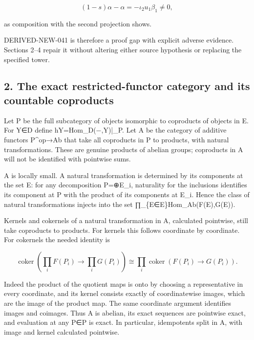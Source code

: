 \documentclass[11pt]{article}
\begin{document}
\[
 (1-s)\alpha-\alpha=-\iota_2u_1\beta_1\ne0,
\]

as composition with the second projection shows.

DERIVED-NEW-041 is therefore a proof gap with explicit adverse evidence. Sections 2–\allowbreak{}4 repair it without altering either source hypothesis or replacing the specified tower.

\subsection{2. The exact restricted-functor category and its countable coproducts}\label{proofs-11460-11655-the-exact-restricted-functor-category-and-its-countable-coproducts}

Let P be the full subcategory of objects isomorphic to coproducts of objects in E. For Y\allowbreak{}∈D define hY\allowbreak{}=Hom\_\allowbreak{}D(−,\allowbreak{}Y)\allowbreak{}|\_\allowbreak{}P. Let A be the category of additive functors P\textasciicircum{}op\allowbreak{}→Ab that take all coproducts in P to products,\allowbreak{} with natural transformations. These are genuine products of abelian groups; coproducts in A will not be identified with pointwise sums.

A is locally small. A natural transformation is determined by its components at the set E:\allowbreak{} for any decomposition P\allowbreak{}=\allowbreak{}⊕E\_\allowbreak{}i,\allowbreak{} naturality for the inclusions identifies its component at P with the product of its components at E\_\allowbreak{}i. Hence the class of natural transformations injects into the set ∏\_\allowbreak{}\{E\allowbreak{}∈E\}Hom\_\allowbreak{}Ab(F(E)\allowbreak{},\allowbreak{}G(E)\allowbreak{})\allowbreak{}.

Kernels and cokernels of a natural transformation in A,\allowbreak{} calculated pointwise,\allowbreak{} still take coproducts to products. For kernels this follows coordinate by coordinate. For cokernels the needed identity is

\[
 \operatorname{coker}\left(\prod_i F(P_i)\to\prod_i G(P_i)\right)
   \cong\prod_i\operatorname{coker}(F(P_i)\to G(P_i)).
\]

Indeed the product of the quotient maps is onto by choosing a representative in every coordinate,\allowbreak{} and its kernel consists exactly of coordinatewise images,\allowbreak{} which are the image of the product map. The same coordinate argument identifies images and coimages. Thus A is abelian,\allowbreak{} its exact sequences are pointwise exact,\allowbreak{} and evaluation at any P\allowbreak{}∈P is exact. In particular,\allowbreak{} idempotents split in A,\allowbreak{} with image and kernel calculated pointwise.
\end{document}
